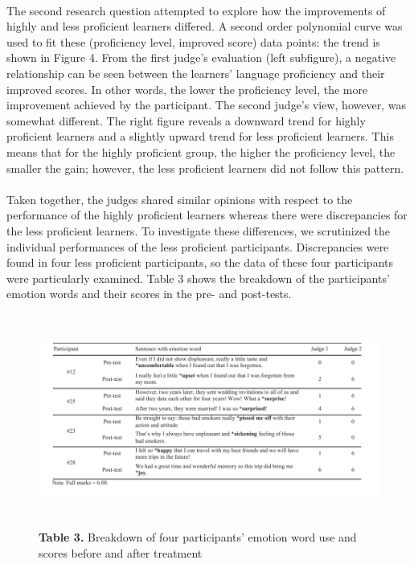 \documentclass[a4paper,12pt,oneside]{article}
\let\counterwithin\relax
\begin{document}
\paragraph{}
The second research question attempted to explore how the improvements of highly and less proficient learners differed. A second order polynomial curve was used to fit these (proficiency level, improved score) data points: the trend is shown in Figure 4. From the first judge’s evaluation (left subfigure), a negative relationship can be seen between the learners’ language proficiency and their improved scores. In other words, the lower the proficiency level, the more improvement achieved by the participant. The second judge’s view, however, was somewhat different. The right figure reveals a downward trend for highly proficient learners and a slightly upward trend for less proficient learners. This means that for the highly proficient group, the higher the proficiency level, the smaller the gain; however, the less proficient learners did not follow this pattern. 
\paragraph{}
Taken together, the judges shared similar opinions with respect to the performance of the highly proficient learners whereas there were discrepancies for the less proficient learners. To investigate these differences, we scrutinized the individual performances of the less proficient participants. Discrepancies were found in four less proficient participants, so the data of these four participants were particularly examined. Table 3 shows the breakdown of the participants’ emotion words and their scores in the pre- and post-tests. 

\begin{figure}[H]
\includegraphics[height=7cm,width=16cm]{Table3.png}
\centering
\caption{\textbf{Table 3.} Breakdown of four participants’ emotion word use and scores before and after treatment}
\end{figure}
\end{document}
